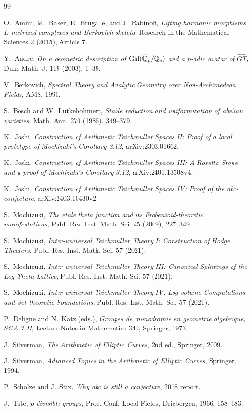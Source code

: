 \begin{thebibliography}{99}

O.~Amini, M.~Baker, E.~Brugalle, and J.~Rabinoff,
\emph{Lifting harmonic morphisms I: metrized complexes and Berkovich skeleta},
Research in the Mathematical Sciences 2 (2015), Article 7.

Y.~Andre,
\emph{On a geometric description of $\operatorname{Gal}(\overline{\mathbb Q}_p/\mathbb Q_p)$ and a $p$-adic avatar of $\widehat{GT}$},
Duke Math. J. 119 (2003), 1--39.

V.~Berkovich,
\emph{Spectral Theory and Analytic Geometry over Non-Archimedean Fields},
AMS, 1990.

S.~Bosch and W.~Lutkebohmert,
\emph{Stable reduction and uniformization of abelian varieties},
Math. Ann. 270 (1985), 349--379.

K.~Joshi,
\emph{Construction of Arithmetic Teichmuller Spaces II: Proof of a local prototype of Mochizuki's Corollary 3.12},
arXiv:2303.01662.

K.~Joshi,
\emph{Construction of Arithmetic Teichmuller Spaces III: A Rosetta Stone and a proof of Mochizuki's Corollary 3.12},
arXiv:2401.13508v4.

K.~Joshi,
\emph{Construction of Arithmetic Teichmuller Spaces IV: Proof of the abc-conjecture},
arXiv:2403.10430v2.

S.~Mochizuki,
\emph{The etale theta function and its Frobenioid-theoretic manifestations},
Publ. Res. Inst. Math. Sci. 45 (2009), 227--349.

S.~Mochizuki,
\emph{Inter-universal Teichmuller Theory I: Construction of Hodge Theaters},
Publ. Res. Inst. Math. Sci. 57 (2021).

S.~Mochizuki,
\emph{Inter-universal Teichmuller Theory III: Canonical Splittings of the Log-Theta-Lattice},
Publ. Res. Inst. Math. Sci. 57 (2021).

S.~Mochizuki,
\emph{Inter-universal Teichmuller Theory IV: Log-volume Computations and Set-theoretic Foundations},
Publ. Res. Inst. Math. Sci. 57 (2021).

P.~Deligne and N.~Katz (eds.),
\emph{Groupes de monodromie en geometrie algebrique, SGA 7 II},
Lecture Notes in Mathematics 340, Springer, 1973.

J.~Silverman,
\emph{The Arithmetic of Elliptic Curves}, 2nd ed., Springer, 2009.

J.~Silverman,
\emph{Advanced Topics in the Arithmetic of Elliptic Curves},
Springer, 1994.

P.~Scholze and J.~Stix,
\emph{Why abc is still a conjecture},
2018 report.

J.~Tate,
\emph{$p$-divisible groups},
Proc. Conf. Local Fields, Driebergen, 1966, 158--183.

\end{thebibliography}
